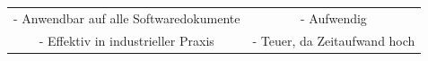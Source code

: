 		\begin{center}
			\begin{tabular}{c|c}
				\color{green}{\textbf{+}}              & \color{red}{\textbf{-}} \\
				\hline
				- Anwendbar auf alle Softwaredokumente & - Aufwendig \\
				- Effektiv in industrieller Praxis     & - Teuer, da Zeitaufwand hoch \\
			\end{tabular}
		\end{center}